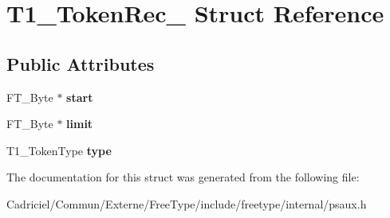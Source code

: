 \hypertarget{struct_t1___token_rec__}{}\section{T1\+\_\+\+Token\+Rec\+\_\+ Struct Reference}
\label{struct_t1___token_rec__}
\subsection*{Public Attributes}
\begin{DoxyCompactItemize}
\item 
F\+T\+\_\+\+Byte $\ast$ {\bfseries start}\hypertarget{struct_t1___token_rec___a1b365e2910220eabf05f925f45bc98d6}{}\label{struct_t1___token_rec___a1b365e2910220eabf05f925f45bc98d6}

\item 
F\+T\+\_\+\+Byte $\ast$ {\bfseries limit}\hypertarget{struct_t1___token_rec___aacd035f0dfbc47b7e1c7eefbe2c2080c}{}\label{struct_t1___token_rec___aacd035f0dfbc47b7e1c7eefbe2c2080c}

\item 
T1\+\_\+\+Token\+Type {\bfseries type}\hypertarget{struct_t1___token_rec___a88b3b889e74609be1827ead4093a2d52}{}\label{struct_t1___token_rec___a88b3b889e74609be1827ead4093a2d52}

\end{DoxyCompactItemize}


The documentation for this struct was generated from the following file\+:\begin{DoxyCompactItemize}
\item 
Cadriciel/\+Commun/\+Externe/\+Free\+Type/include/freetype/internal/psaux.\+h\end{DoxyCompactItemize}
